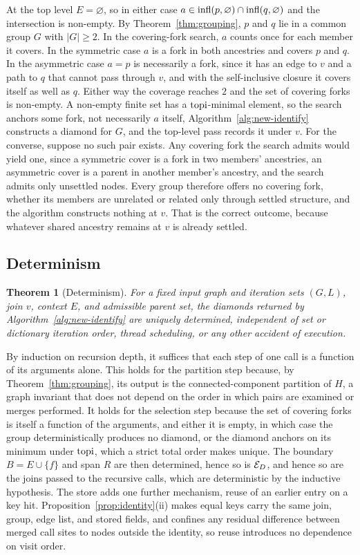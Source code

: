 \documentclass[12pt]{report}
\newtheorem{theorem}{Theorem}
\begin{document}
At the top level $E = \varnothing$, so in either case $a \in \mathrm{infl}(p,\varnothing)\cap\mathrm{infl}(q,\varnothing)$ and the intersection is non-empty. By Theorem~\ref{thm:grouping}, $p$ and $q$ lie in a common group $G$ with $|G|\ge 2$. In the covering-fork search, $a$ counts once for each member it covers. In the symmetric case $a$ is a fork in both ancestries and covers $p$ and $q$. In the asymmetric case $a = p$ is necessarily a fork, since it has an edge to $v$ and a path to $q$ that cannot pass through $v$, and with the self-inclusive closure it covers itself as well as $q$. Either way the coverage reaches $2$ and the set of covering forks is non-empty. A non-empty finite set has a $\mathrm{topi}$-minimal element, so the search anchors some fork, not necessarily $a$ itself, Algorithm~\ref{alg:new-identify} constructs a diamond for $G$, and the top-level pass records it under $v$. For the converse, suppose no such pair exists. Any covering fork the search admits would yield one, since a symmetric cover is a fork in two members' ancestries, an asymmetric cover is a parent in another member's ancestry, and the search admits only unsettled nodes. Every group therefore offers no covering fork, whether its members are unrelated or related only through settled structure, and the algorithm constructs nothing at $v$. That is the correct outcome, because whatever shared ancestry remains at $v$ is already settled.

\subsection{Determinism}

\begin{theorem}[Determinism]
\label{thm:determinism}
For a fixed input graph and iteration sets $(G, L)$, join $v$, context $E$, and admissible parent set, the diamonds returned by Algorithm~\ref{alg:new-identify} are uniquely determined, independent of set or dictionary iteration order, thread scheduling, or any other accident of execution.
\end{theorem}

By induction on recursion depth, it suffices that each step of one call is a function of its arguments alone. This holds for the partition step because, by Theorem~\ref{thm:grouping}, its output is the connected-component partition of $H$, a graph invariant that does not depend on the order in which pairs are examined or merges performed. It holds for the selection step because the set of covering forks is itself a function of the arguments, and either it is empty, in which case the group deterministically produces no diamond, or the diamond anchors on its minimum under $\mathrm{topi}$, which a strict total order makes unique. The boundary $B = E \cup \{f\}$ and span $R$ are then determined, hence so is $\mathcal{E}_D$, and hence so are the joins passed to the recursive calls, which are deterministic by the inductive hypothesis. The store adds one further mechanism, reuse of an earlier entry on a key hit. Proposition~\ref{prop:identity}(ii) makes equal keys carry the same join, group, edge list, and stored fields, and confines any residual difference between merged call sites to nodes outside the identity, so reuse introduces no dependence on visit order.
\end{document}
